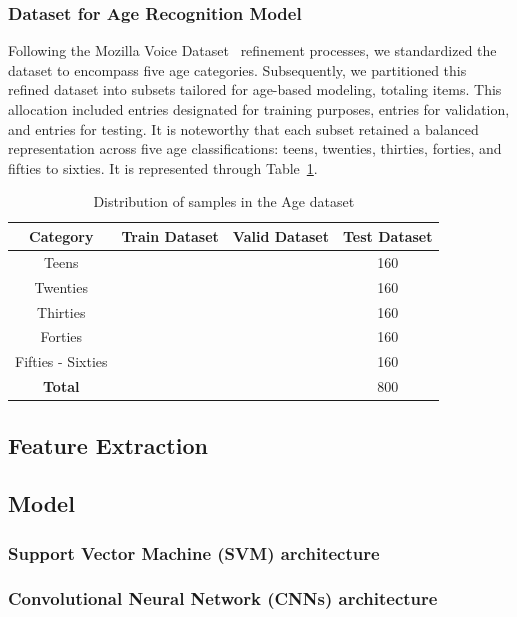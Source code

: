 \documentclass[conference, 10pt]{IEEEtran}
\begin{document}
\subsubsection{Dataset for Age Recognition Model}
 Following the Mozilla Voice Dataset~\cite{mozilla_voice} refinement processes, we standardized the dataset to encompass five age categories. Subsequently, we partitioned this refined dataset into subsets tailored for age-based modeling, totaling %
 items. This allocation included %
 entries designated for training purposes, %
 entries for validation, and %
 entries for testing. It is noteworthy that each subset retained a balanced representation across five age classifications: teens, twenties, thirties, forties, and fifties to sixties. It is represented through Table~\ref{tab:Distribution of samples in the Age dataset}.

\begin{table}[htbp]
    \centering
    \caption{Distribution of samples in the Age dataset}
    \label{tab:Distribution of samples in the Age dataset}
    \begin{tabular}{|c|ccc|}
    \hline
    \textbf{Category} & \textbf{Train Dataset} & \textbf{Valid Dataset} & \textbf{Test Dataset}\\
    \hline
    Teens &  &  & 160 \\
    Twenties &  &  & 160 \\
    Thirties &  &  & 160 \\
    Forties &  &  & 160 \\
    Fifties - Sixties &  &  & 160 \\
    \hline
    \textbf{Total} &  &  & 800\\
    \hline
    \end{tabular}
\end{table}
\subsection{Feature Extraction}
\subsection{Model}
\subsubsection{Support Vector Machine (SVM) architecture}
\subsubsection{Convolutional Neural Network (CNNs) architecture}
\end{document}
